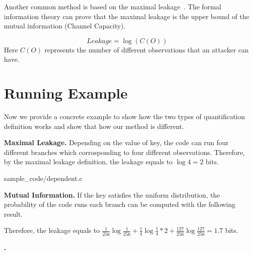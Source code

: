 Another common method is based on the maximal leakage~\cite{10.1007/978-3-642-00596-1_21,10.1007/978-3-642-31424-7_40,182946}.
The formal information theory can prove that the maximal leakage is the upper bound of the mutual 
information (Channel Capacity).

\begin{displaymath}
    \mathit{Leakage} = \log(C(O))
\end{displaymath}
Here $C(O)$ represents the number of different observations that an attacker can have. 


\section{Running Example}

Now we provide a concrete example to show how the two types of quantification definition works and show that
how our method is different.

\vspace{3pt}
\textbf{Maximal Leakage.} 
Depending on the value of key, the code can run four different branches which corrosponding to 
four different observations. Therefore, by the maximal leakage definition, the leakage equals to 
$\log4 = 2$ bits.


                 {sample_code/dependent.c}

\vspace{3pt}
\textbf{Mutual Information.}
If the key satisfies the uniform distribution, the probability of the code runs each branch
can be computed with the following result.  

\begin{table}[h]
\centering
{}
\caption{The distribution of observations}
\end{table}

Therefore, the leakage equals to 
$\frac{1}{256}\log\frac{1}{256} + \frac{1}{4}\log\frac{1}{4}*2 + \frac{127}{256}\log\frac{127}{256} = 1.7$ bits.

\vspace{3pt}
\textbf{\tool.}
